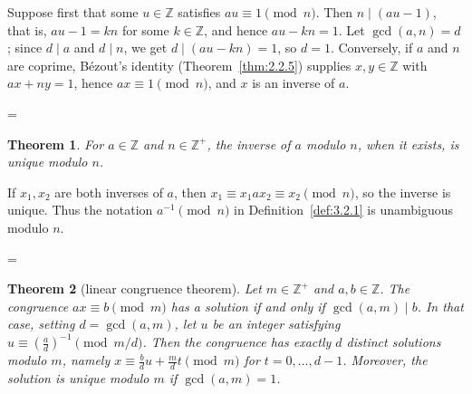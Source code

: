 \documentclass[11pt]{article}
\makeatletter
\theoremstyle{ntstyle}
\newtheorem{theorem}{Theorem}[subsection]
\let\nt@closedisplay\]
\def\nt@guardedclose{\@ifnextchar\par{\nt@closeafterpar}{\@ifnextchar\end{\postdisplaypenalty\@M\nt@closedisplay}{\nt@closedisplay}}}
\def\nt@closeafterpar\par{\@ifnextchar\par{\nt@closeafterpar}{\@ifnextchar\end{\postdisplaypenalty\@M\nt@closedisplay\par}{\nt@closedisplay\par}}}
\renewenvironment{proof}[1][\proofname]{\par
  \pushQED{\qed}\normalfont\topsep\medskipamount\edef\nt@afterproof{\@endparpenalty=\the\@endparpenalty\relax}\@beginparpenalty\@M\@endparpenalty\@M\let\]\nt@guardedclose\trivlist\item[]\textit{#1\@addpunct{.}} \ignorespaces}{\ifvmode\addpenalty\@M\fi\popQED\nt@afterproof\endtrivlist\@endpefalse}
\makeatother
\begin{document}
\begin{proof} Suppose first that some $u \in \mathbb{Z}$ satisfies
	$au \equiv 1 \pmod{n}$. Then $n \mid (au - 1)$, that is, $au - 1 = kn$
	for some $k \in \mathbb{Z}$, and hence $au - kn = 1$. Let $\gcd(a, n) =
		d$; since $d \mid a$ and $d \mid n$, we get $d \mid (au - kn) = 1$, so
	$d = 1$. Conversely, if $a$
	and $n$ are coprime, B{\'e}zout's identity (Theorem~\ref{thm:2.2.5}) supplies $x, y \in
		\mathbb{Z}$ with $ax + ny = 1$, hence $ax \equiv 1 \pmod{n}$,
	and $x$ is an inverse of $a$.

\end{proof}
\begin{theorem}\label{thm:3.2.2} For $a \in \mathbb{Z}$ and $n\in\mathbb{Z}^+$, the inverse of
	$a$ modulo $n$, when it exists, is unique modulo $n$.

\end{theorem}

\begin{proof} If $x_1, x_2$ are both inverses of $a$,
	then $x_1 \equiv x_1 a x_2 \equiv x_2 \pmod{n}$, so the inverse is
	unique. Thus the notation $a^{-1} \pmod{n}$ in Definition~\ref{def:3.2.1} is
	unambiguous modulo $n$.

\end{proof}
\begin{theorem}[linear congruence theorem]\label{thm:3.2.3} Let $m \in \mathbb{Z}^+$ and $a, b \in \mathbb{Z}$. The congruence $ax \equiv
		b \pmod{m}$ has a solution if and only if $\gcd(a, m) \mid b$. In that case, setting $d = \gcd(a, m)$, let $u$ be an integer satisfying $u\equiv(\tfrac{a}{d})^{-1}\pmod{m/d}$. Then the congruence has exactly $d$
	distinct solutions modulo $m$, namely
	$x\equiv\tfrac{b}{d}u+\tfrac{m}{d}t\pmod{m}$ for
	$t=0,\ldots,d-1$.
	Moreover, the solution is unique modulo $m$ if $\gcd(a, m) = 1$.

\end{theorem}
\end{document}
